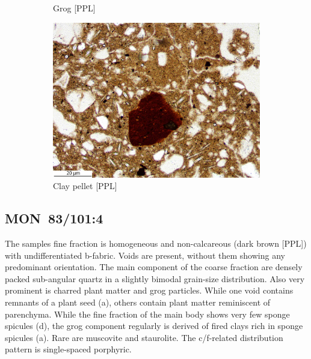 \documentclass[a4paper]{article}
\begin{document}
\begin{figure}[H]
\begin{subfigure}[t]{.32\textwidth}
		\caption{Grog [PPL]}
	\end{subfigure}\hspace{.1em}\hfill
	\begin{subfigure}[t]{.32\textwidth}
		\includegraphics[width=\textwidth]{ThinSections/51-5_10x_PPL.jpg}
		\caption{Clay pellet [PPL]}
	\end{subfigure}\hspace{.1em}\hfill
	\caption{}
	\label{fig:51_mon}
\end{figure}

\newpage\subsection{MON~83/101:4 \citep[mon\#52; Fig.~\ref{fig:wafmon.pottery}.4; \ref{fig:thinsections}J;][505 Pl.~71.6]{Wotzka.1995}}

\begin{multicols}{2}
\noindent The samples fine fraction is homogeneous and non-calcareous (dark brown [PPL]) with undifferentiated b-fabric. Voids are present, without them showing any predominant orientation. The main component of the coarse fraction are densely packed sub-angular quartz in a slightly bimodal grain-size distribution. Also very prominent is charred plant matter and grog particles. While one void contains remnants of a plant seed (a), others contain plant matter reminiscent of parenchyma. While the fine fraction of the main body shows very few sponge spicules (d), the grog component regularly is derived of fired clays rich in sponge spicules (a). Rare are muscovite and staurolite. The c/f-related distribution pattern is single-spaced porphyric.
\end{multicols}
\end{document}
